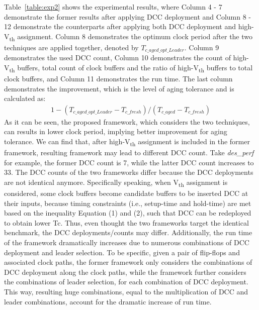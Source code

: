 Table~\ref{table:exp2} shows the experimental results, where Column 4 - 7 demonstrate the former results after applying DCC deployment  and Column 8 - 12 demonstrate the counterparts after applying both DCC deployment and high-V\textsubscript{th} assignment. Column 8 demonstrates the optimum clock period after the two techniques are applied together, denoted by $T_{c\_aged\_opt\_Leader}$. Column 9 demonstrates the used DCC count, Column 10 demonstrates the count of high-V\textsubscript{th} buffers, total count of clock buffers and the ratio of high-V\textsubscript{th} buffers to total clock buffers, and Column 11 demonstrates the run time. The last column demonstrates the improvement, which is the level of aging tolerance and is calculated as:
\begin{gather*}
1 - (T_{c\_aged\_opt\_Leader} - T_{c\_fresh}) / (T_{c\_aged} - T_{c\_fresh})
\end{gather*}
As it can be seen, the proposed framework, which considers the two techniques, can results in lower clock period, implying better improvement for aging tolerance. We can find that, after high-V\textsubscript{th} assignment is included in the former framework, resulting framework may lead to different DCC count. Take \textit{des\_perf} for example, the former DCC count is 7, while the latter DCC count increases to 33. The DCC counts of the two frameworks differ because the DCC deployments are not identical anymore. Specifically speaking, when V\textsubscript{th} assignment is considered, some clock buffers become candidate buffers to be inserted DCC at their inputs, because timing constraints (i.e., setup-time and hold-time) are met based on the inequality Equation (1) and (2), such that DCC can be redeployed to obtain lower Tc. Thus, even thought the two frameworks target the identical benchmark, the DCC deployments/counts may differ. Additionally, the run time of the framework dramatically increases due to numerous combinations of DCC deployment and leader selection. To be specific, given a pair of flip-flops and associated clock paths, the former framework only considers the combinations of DCC deployment along the clock paths, while the framework further considers the combinations of leader selection, for each combination of DCC deployment. This way, resulting huge combinations, equal to the multiplication of DCC and leader combinations, account for the dramatic increase of run time.
